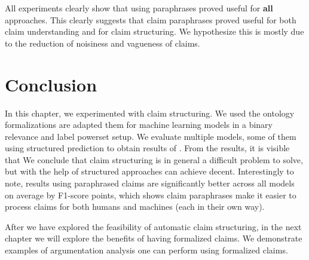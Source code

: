 All experiments clearly show that using paraphrases proved useful for
\textbf{all} approaches. This clearly suggests that claim paraphrases
proved useful for both claim understanding and for claim structuring. 
We hypothesize this is mostly due to the reduction of noisiness and 
vagueness of claims. 


\section{Conclusion}
\label{sec:claim_struc_conclusion}

In this chapter, we experimented with claim structuring. 
We used the ontology formalizations are adapted them for 
machine learning models in a binary relevance and label powerset setup. 
We evaluate multiple models, some of them using structured prediction to obtain 
results of . From the results, it is 
visible that 
We conclude that claim structuring is in general a difficult problem to solve,
but with the help of structured approaches can achieve decent. 
Interestingly to note, results using paraphrased claims are significantly
better across all models on average by F1-score points, which shows claim
paraphrases make it easier to process claims for both humans and machines (each
in their own way). 

After we have explored the feasibility of automatic claim structuring, in the
next chapter we will explore the benefits of having formalized claims. 
We demonstrate examples of argumentation analysis one can perform using
formalized claims. 

